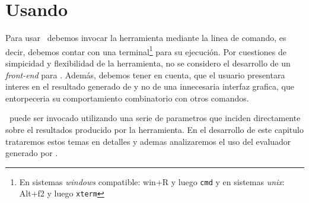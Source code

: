 \chapter{Usando \maggen}
\label{chap:usos}
\minitoc
Para usar \maggen\ debemos invocar la herramienta mediante la linea de comando, es decir, debemos contar con una terminal\footnote{En sistemas \textit{windows} compatible: win+R y luego \texttt{cmd} y en sistemas \textit{unix}: Alt+f2 y luego \texttt{xterm}} para su ejecución. Por cuestiones de simpicidad y flexibilidad de la herramienta, no se considero el desarrollo de un \textit{front-end} para \maggen. Además, debemos tener en cuenta, que el usuario presentara interes en el resultado generado de \maggen y no de una innecesaria interfaz grafica, que entorpeceria su comportamiento combinatorio con otros comandos.
  
\maggen\ puede ser invocado utilizando una serie de parametros que inciden directamente sobre el resultados producido por la herramienta. En el desarrollo de este capitulo trataremos estos temas en detalles y ademas analizaremos el uso del evaluador generado por \maggen.

